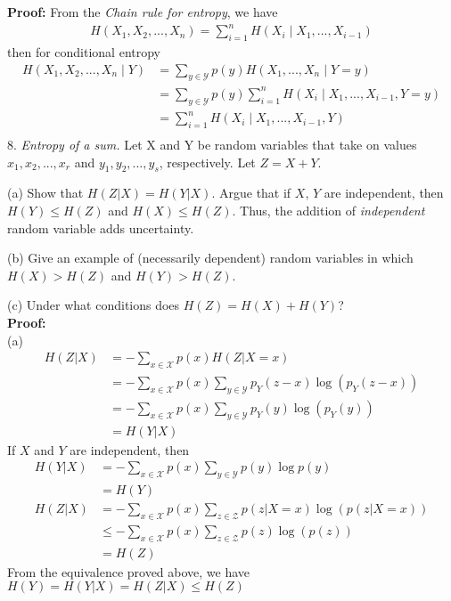 \documentclass[12pt]{article}
\begin{document}
	\textbf{Proof:} From the \textit{Chain rule for entropy}, we have
	\begin{align*}
		H(X_1,X_2,...,X_n) = \sum_{i=1}^{n}H(X_i\mid X_1,...,X_{i-1})
	\end{align*}
	then for conditional entropy
	\begin{align*}
		H(X_1,X_2,...,X_n\mid Y)  &= \sum_{y\in\mathcal{Y}}p(y)H(X_1,...,X_n\mid Y=y) \\
								  &= \sum_{y\in\mathcal{Y}}p(y)\sum_{i=1}^{n}H(X_i\mid X_1,...,X_{i-1}, Y=y) \\
								  &= \sum_{i=1}^{n}H(X_i\mid X_1,...,X_{i-1},Y)\\
	\end{align*}
	8. \textit{Entropy of a sum.} Let X and Y be random variables that take on values $x_1,x_2,...,x_r$ and $y_1,y_2,...,y_s$, respectively. Let $Z = X + Y$.\par 
	(a) Show that $H(Z|X) = H(Y|X)$. Argue that if $X$, $Y$ are independent, then $H(Y) \leq H(Z)$ and $H(X) \leq H(Z)$. Thus, the addition of \textit{independent} random variable adds uncertainty. \par 
	(b) Give an example of (necessarily dependent) random variables in which $H(X) > H(Z)$ and $H(Y) > H(Z)$. \par 
	(c) Under what conditions does $H(Z) = H(X) + H(Y)$? \\
	\textbf{Proof:} \\
	(a) 
	\begin{align*}
		H(Z|X) &= -\sum_{x\in\mathcal{X}}p(x)H(Z|X=x) \\
			   &= -\sum_{x\in\mathcal{X}}p(x)\sum_{y\in\mathcal{Y}}p_Y(z-x)\log(p_Y(z-x)) \\
			   &= -\sum_{x\in\mathcal{X}}p(x)\sum_{y\in\mathcal{Y}}p_Y(y)\log(p_Y(y)) \\
			   &= H(Y|X)	
	\end{align*}
	If $X$ and $Y$ are independent, then
	\begin{align*}
		H(Y|X) &= -\sum_{x\in\mathcal{X}}p(x)\sum_{y\in\mathcal{Y}}p(y)\log p(y) \\
		       &= H(Y) \\
		H(Z|X) &= -\sum_{x\in\mathcal{X}}p(x)\sum_{z\in\mathcal{Z}}p(z|X=x)\log(p(z|X=x)) \\
			   &\leq -\sum_{x\in\mathcal{X}}p(x)\sum_{z\in\mathcal{Z}}p(z)\log(p(z)) \\
			   &= H(Z) 	       
	\end{align*}
	From the equivalence proved above, we have $H(Y) = H(Y|X) = H(Z|X) \leq H(Z)$ \\
\end{document}
